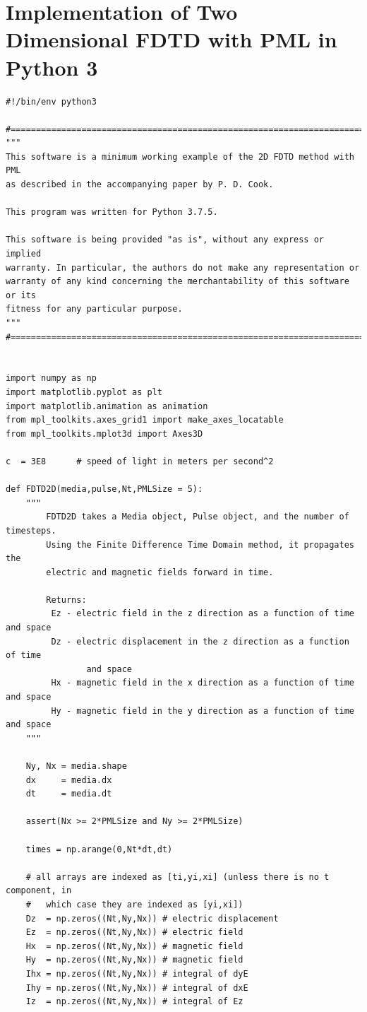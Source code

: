 \documentclass[12pt,twocolumn]{article}
\begin{document}
\section{Implementation of Two Dimensional FDTD with PML in Python 3}
\label{ap:Code}
\begin{verbatim}
#!/bin/env python3

#=============================================================================#
"""
This software is a minimum working example of the 2D FDTD method with PML
as described in the accompanying paper by P. D. Cook.

This program was written for Python 3.7.5.

This software is being provided "as is", without any express or implied
warranty. In particular, the authors do not make any representation or
warranty of any kind concerning the merchantability of this software or its
fitness for any particular purpose.
"""
#=============================================================================#


import numpy as np
import matplotlib.pyplot as plt
import matplotlib.animation as animation
from mpl_toolkits.axes_grid1 import make_axes_locatable
from mpl_toolkits.mplot3d import Axes3D

c  = 3E8      # speed of light in meters per second^2

def FDTD2D(media,pulse,Nt,PMLSize = 5):
    """
        FDTD2D takes a Media object, Pulse object, and the number of timesteps.
        Using the Finite Difference Time Domain method, it propagates the
        electric and magnetic fields forward in time.

        Returns:
         Ez - electric field in the z direction as a function of time and space
         Dz - electric displacement in the z direction as a function of time
                and space
         Hx - magnetic field in the x direction as a function of time and space
         Hy - magnetic field in the y direction as a function of time and space
    """

    Ny, Nx = media.shape
    dx     = media.dx
    dt     = media.dt

    assert(Nx >= 2*PMLSize and Ny >= 2*PMLSize)

    times = np.arange(0,Nt*dt,dt)

    # all arrays are indexed as [ti,yi,xi] (unless there is no t component, in
    #   which case they are indexed as [yi,xi])
    Dz  = np.zeros((Nt,Ny,Nx)) # electric displacement
    Ez  = np.zeros((Nt,Ny,Nx)) # electric field
    Hx  = np.zeros((Nt,Ny,Nx)) # magnetic field
    Hy  = np.zeros((Nt,Ny,Nx)) # magnetic field
    Ihx = np.zeros((Nt,Ny,Nx)) # integral of dyE
    Ihy = np.zeros((Nt,Ny,Nx)) # integral of dxE
    Iz  = np.zeros((Nt,Ny,Nx)) # integral of Ez


\end{verbatim}
\end{document}
